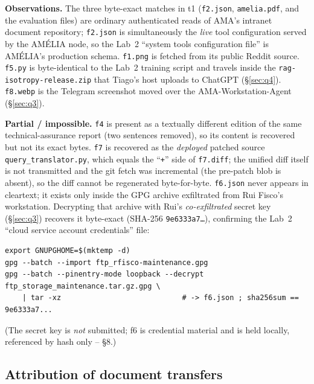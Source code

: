 \documentclass[11pt,a4paper,final,oneside]{article}
\begin{document}
\textbf{Observations.} The three byte-exact matches in t1 (\texttt{f2.json},
\texttt{amelia.pdf}, and the evaluation files) are ordinary authenticated reads
of AMA's intranet document repository; \texttt{f2.json} is simultaneously the
\emph{live} tool configuration served by the AMÉLIA node, so the Lab~2 ``system
tools configuration file'' is AMÉLIA's production schema. \texttt{f1.png} is
fetched from its public Reddit source. \texttt{f5.py} is byte-identical to the
Lab~2 training script and travels inside the \texttt{rag-isotropy-release.zip}
that Tiago's host uploads to ChatGPT (§\ref{sec:q4}). \texttt{f8.webp} is the
Telegram screenshot moved over the AMA-Workstation-Agent (§\ref{sec:q3}).

\textbf{Partial / impossible.} \texttt{f4} is present as a textually different
edition of the same technical-assurance report (two sentences removed), so its
content is recovered but not its exact bytes. \texttt{f7} is recovered as the
\emph{deployed} patched source \texttt{query\_translator.py}, which equals the
``\texttt{+}'' side of \texttt{f7.diff}; the unified diff itself is not transmitted
and the git fetch was incremental (the pre-patch blob is absent), so the diff
cannot be regenerated byte-for-byte. \texttt{f6.json} never appears in cleartext;
it exists only inside the GPG archive exfiltrated from Rui Fisco's workstation.
Decrypting that archive with Rui's \emph{co-exfiltrated} secret key (§\ref{sec:q3})
recovers it byte-exact (SHA-256 \texttt{9e6333a7\ldots}), confirming the Lab~2
``cloud service account credentials'' file:

{\footnotesize
\begin{verbatim}
export GNUPGHOME=$(mktemp -d)
gpg --batch --import ftp_rfisco-maintenance.gpg
gpg --batch --pinentry-mode loopback --decrypt ftp_storage_maintenance.tar.gz.gpg \
    | tar -xz                            # -> f6.json ; sha256sum == 9e6333a7...
\end{verbatim}}

(The secret key is \emph{not} submitted; f6 is credential material and is held
locally, referenced by hash only -- §8.)

\subsection{Attribution of document transfers}
\label{sec:q2}
\end{document}

